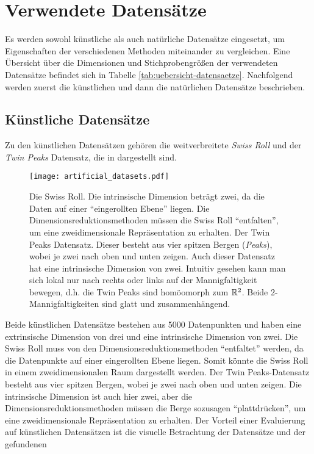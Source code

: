 \section{Verwendete Datensätze}
\label{ch:Vergleich:sec:VerwendeteDatensaetze}
Es werden sowohl künstliche als auch natürliche Datensätze eingesetzt, um Eigenschaften der
verschiedenen Methoden miteinander zu vergleichen. Eine Übersicht über die Dimensionen und Stichprobengrößen der verwendeten Datensätze befindet sich in Tabelle \ref{tab:uebersicht-datensaetze}. Nachfolgend werden zuerst die künstlichen und dann die natürlichen Datensätze beschrieben.

\subsection{Künstliche Datensätze}
\label{ch:Vergleich:sec:VerwendeteDatensaetze:kuenstlich}
Zu den künstlichen Datensätzen gehören die weitverbreitete \textit{Swiss Roll} und der \textit{Twin Peaks} Datensatz, die in  dargestellt sind.
\begin{figure}[htb]
	\begin{center}
		\texttt{[image: artificial\_datasets.pdf]}
	\end{center}
	\caption[Künstliche Datensätze]{\figleft Die Swiss Roll. Die intrinsische Dimension beträgt zwei, da die Daten auf einer \enquote{eingerollten Ebene} liegen. Die Dimensionsreduktionsmethoden müssen die Swiss Roll \enquote{entfalten}, um eine zweidimensionale Repräsentation zu erhalten. \figright Der Twin Peaks Datensatz. Dieser besteht aus vier spitzen Bergen (\textit{Peaks}), wobei je zwei nach oben und unten zeigen. Auch dieser Datensatz hat eine intrinsische Dimension von zwei. Intuitiv gesehen kann man sich lokal nur nach rechts oder links auf der Mannigfaltigkeit bewegen, d.h. die Twin Peaks sind homöomorph zum $\mathbb{R}^2$. Beide 2-Mannigfaltigkeiten sind glatt und zusammenhängend.}
	\label{fig:ArtificialDatasets}
\end{figure}
Beide künstlichen Datensätze bestehen aus \num{5000} Datenpunkten und haben eine extrinsische Dimension von drei und eine intrinsische
Dimension von zwei. Die Swiss Roll muss von den Dimensionsreduktionsmethoden \enquote{entfaltet} werden, da die Datenpunkte auf einer eingerollten Ebene liegen. Somit könnte die Swiss Roll in einem zweidimensionalen Raum dargestellt werden. Der Twin Peaks-Datensatz besteht aus vier spitzen Bergen, wobei je zwei nach oben und unten zeigen. Die intrinsische Dimension ist auch hier zwei, aber die Dimensionsreduktionsmethoden müssen die Berge sozusagen \enquote{plattdrücken}, um eine zweidimensionale Repräsentation zu erhalten. Der Vorteil einer Evaluierung auf künstlichen Datensätzen ist die visuelle Betrachtung der Datensätze und der gefundenen
